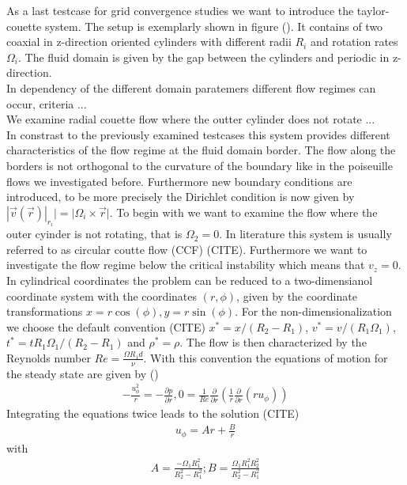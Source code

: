 As a last testcase for grid convergence studies we want to introduce the taylor-couette system.
The setup is exemplarly shown in figure (). It contains of two coaxial in z-direction oriented cylinders
with different radii $R_i$ and rotation rates $\Omega_i$. The fluid domain is given by the gap between the cylinders and
periodic in z-direction.\\
In dependency of the different domain paratemers different flow regimes can occur, criteria ...\\
We examine radial couette flow where the outter cylinder does not rotate ...\\
In constrast to the previously examined testcases this system provides different characteristics
of the flow regime at the fluid domain border. The flow along the borders is not orthogonal to the curvature of
the boundary like in the poiseuille flows we investigated before. Furthermore  new boundary
conditions are introduced, to be more precisely the Dirichlet condition is now given by $|\vec{v}(\vec{r})|_{r_i} | = |\Omega_i \times \vec{r}|$.
To begin with we want to examine the flow where the outer cyinder is not rotating, that is $\Omega_2 = 0$.
In literature this system is usually referred to as circular coutte flow (CCF) (CITE). Furthermore we want to investigate the flow regime
below the critical instability which means that $v_z=0$. In cylindrical coordinates the problem can be reduced to a two-dimensianol coordinate system with
the coordinates $(r, \phi)$, given by the coordinate transformations $x=r\cos(\phi), y = r\sin(\phi)$.
For the non-dimensionalization we choose the default convention (CITE) $x^*=x/(R_2 - R_1)$, $v^*=v/(R_1\Omega_1)$, $t^*=tR_1\Omega_1/(R_2-R_1)$ and $\rho^*=\rho$.
The flow is then characterized by the Reynolds number $Re = \frac{\Omega R_1d}{\nu}$. With this convention the equations of motion for the steady state are given by ()
\begin{align}
    -\frac{u^2_\phi}{r} = - \frac{\partial p}{\partial r}, 0 = \frac{1}{Re}\frac{\partial}{\partial r}\left(\frac{1}{r}\frac{\partial}{\partial r}(r u_\phi)\right)
\end{align}
Integrating the equations twice leads to the solution (CITE)
\begin{align}
    u_\phi = Ar + \frac{B}{r}
\end{align}
with
\begin{align}
    A = \frac{-\Omega_1R_1^2}{R^2_2 - R^2_1} ; B = \frac{\Omega_1R^2_1 R^2_2}{R^2_2 - R^2_1}
\end{align}

